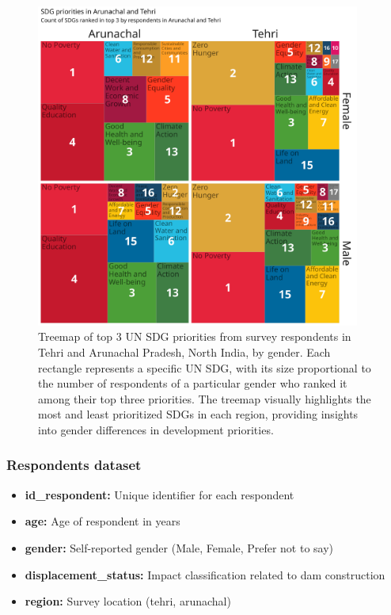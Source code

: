 \documentclass{article}
\begin{document}
\begin{figure}[ht]
  \centering
  \includegraphics[width=0.95\textwidth]{../figures_and_tables/top3-gender-treemap.png}
  \caption{\label{fig:top3-gender-treemap} Treemap of top 3 UN SDG priorities from survey respondents in Tehri and Arunachal Pradesh, North India, by gender. Each rectangle represents a specific UN SDG, with its size proportional to the number of respondents of a particular gender who ranked it among their top three priorities. The treemap visually highlights the most and least prioritized SDGs in each region, providing insights into gender differences in development priorities.}
\end{figure}

\subsubsection{Respondents dataset}

\begin{itemize}
  \item \textbf{id\_respondent:} Unique identifier for each respondent
  \item \textbf{age:} Age of respondent in years
  \item \textbf{gender:} Self-reported gender (Male, Female, Prefer not to say)
  \item \textbf{displacement\_status:} Impact classification related to dam construction
  \item \textbf{region:} Survey location (tehri, arunachal)
\end{itemize}
\end{document}
